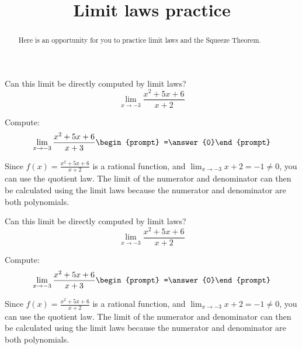 \documentclass[handout]{ximera}
\title{Limit laws practice}
\begin{document}
\begin{abstract}
Here is an opportunity for you to practice limit laws and the Squeeze Theorem.
\end{abstract}
\maketitle

\begin{exercise}
  Can this limit be directly computed by limit laws?
  \[
  \displaystyle\lim_{x\to -3}\frac{x^2+5x+6}{x+2} 
  \]
  \begin{multipleChoice}
  \end{multipleChoice}
  \begin{question}
    Compute:
    \[
    \displaystyle\lim_{x\to -3}\frac{x^2+5x+6}{x+3}\begin{prompt} =\answer{0}\end{prompt}
    \]
    \begin{feedback}
      Since $f(x)=\frac{x^2+5x+6}{x+2}$ is a rational function, and
      $\displaystyle\lim_{x\to -3} x+2 =-1 \neq 0$, you can use the quotient law.  The limit of the numerator and denominator can then be calculated using the limit laws because the numerator and denominator are both polynomials. 
    \end{feedback}
  \end{question}
\end{exercise}

\begin{exercise}
  Can this limit be directly computed by limit laws?
  \[
  \displaystyle\lim_{x\to -3}\frac{x^2+5x+6}{x+2} 
  \]
  \begin{multipleChoice}
  \end{multipleChoice}
  \begin{question}
    Compute:
    \[
    \displaystyle\lim_{x\to -3}\frac{x^2+5x+6}{x+3}\begin{prompt} =\answer{0}\end{prompt}
    \]
    \begin{feedback}
      Since $f(x)=\frac{x^2+5x+6}{x+2}$ is a rational function, and
      $\displaystyle\lim_{x\to -3} x+2 =-1 \neq 0$, you can use the quotient law.  The limit of the numerator and denominator can then be calculated using the limit laws because the numerator and denominator are both polynomials. 
    \end{feedback}
  \end{question}
\end{exercise}
\end{document}
